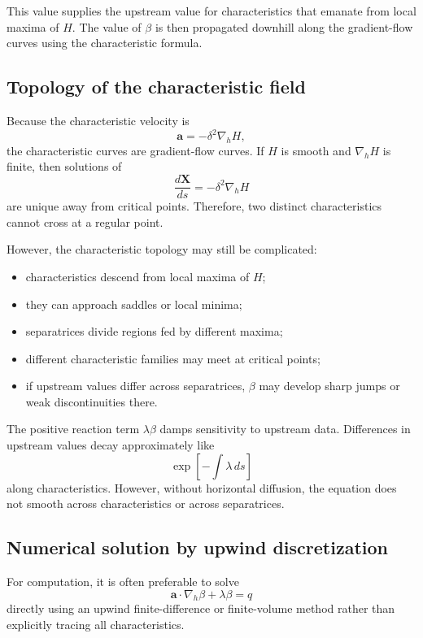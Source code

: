\documentclass[11pt]{amsart}
\begin{document}
This value supplies the upstream value for characteristics that emanate from
local maxima of \(H\). The value of \(\beta\) is then propagated downhill along
the gradient-flow curves using the characteristic formula.

\subsection{Topology of the characteristic field}

Because the characteristic velocity is
\[
\mathbf{a}=-\delta^2\nabla_h H,
\]
the characteristic curves are gradient-flow curves. If \(H\) is smooth and
\(\nabla_h H\) is finite, then solutions of
\[
\frac{d\mathbf{X}}{ds}=-\delta^2\nabla_h H
\]
are unique away from critical points. Therefore, two distinct characteristics
cannot cross at a regular point.

However, the characteristic topology may still be complicated:

\begin{itemize}
    \item characteristics descend from local maxima of \(H\);
    \item they can approach saddles or local minima;
    \item separatrices divide regions fed by different maxima;
    \item different characteristic families may meet at critical points;
    \item if upstream values differ across separatrices, \(\beta\) may develop
    sharp jumps or weak discontinuities there.
\end{itemize}

The positive reaction term \(\lambda\beta\) damps sensitivity to upstream data.
Differences in upstream values decay approximately like
\[
\exp\left[-\int \lambda\,ds\right]
\]
along characteristics. However, without horizontal diffusion, the equation does
not smooth across characteristics or across separatrices.

\subsection{Numerical solution by upwind discretization}

For computation, it is often preferable to solve
\[
\mathbf{a}\cdot\nabla_h\beta+\lambda\beta=q
\]
directly using an upwind finite-difference or finite-volume method rather than
explicitly tracing all characteristics.
\end{document}
